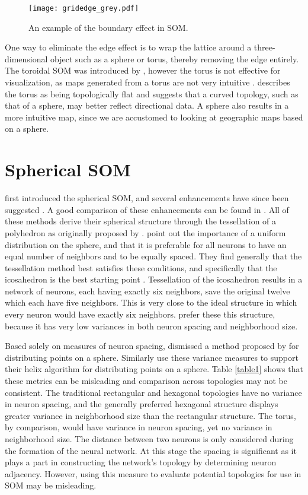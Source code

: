 \begin{figure}[htb]
\centering
\texttt{[image: gridedge\_grey.pdf]}
\caption{An example of the boundary effect in SOM.}
\label{som:states}
\end{figure}

One way to eliminate the edge effect is to wrap the lattice around a
three-dimensional object such as a sphere or torus, thereby removing the edge
entirely. The toroidal SOM was introduced by \cite{li1993}, however the torus
is not effective for visualization, as maps generated from a torus are not
very intuitive \citep{ito2000,wu2006}.  \cite{ritter99} describes the torus as
being topologically flat and suggests that a curved topology, such as that of
a sphere, may better reflect directional data.  A sphere also results in a
more intuitive map, since we are accustomed to looking at geographic maps
based on a sphere.  

\section{Spherical SOM}
\label{bg:sphere}
\cite{ritter99} first introduced the spherical SOM, and several enhancements have
since been suggested \citep{boudjemai2003,sangole03,Nishio:2006fk,wu2006}.  A
good comparison of these enhancements can be found in \cite{wu2006}.  All of
these methods derive their spherical structure through the tessellation of a
polyhedron as originally proposed by \cite{ritter99}.  \cite{wu2006} point
out the importance of a uniform distribution on the sphere, and that it is
preferable for all neurons to have an equal number of neighbors and to be
equally spaced.  They find generally that the tessellation method best satisfies
these conditions, and specifically that the icosahedron is the best starting
point \citep{wu2005}. Tessellation of the icosahedron results in a network of
neurons, each having exactly six neighbors, save the original twelve
which each have five neighbors.  This is very close to the ideal structure in
which every neuron would have exactly six neighbors.  \cite{wu2006} prefer
these this structure, because it has very low variances in both neuron spacing
and neighborhood size. 

Based solely on measures of neuron spacing, \cite{wu2005} dismissed a method
proposed by \cite{Rakhmanov94} for distributing points on a sphere.  Similarly
\cite{Nishio:2006fk} use these variance measures to support their helix
algorithm for distributing points on a sphere.  Table \ref{table1} shows that
these metrics can be misleading and comparison across topologies may not be
consistent.  The traditional rectangular and hexagonal topologies have no
variance in neuron spacing, and the generally preferred hexagonal structure
displays greater variance in neighborhood size than the rectangular structure.
The torus, by comparison, would have variance in neuron spacing, yet no
variance in neighborhood size.  The distance between two neurons is only
considered during the formation of the neural network.  At this stage the
spacing is significant as it plays a part in constructing the network's
topology by determining neuron adjacency.  However, using this measure to
evaluate potential topologies for use in SOM may be misleading.

